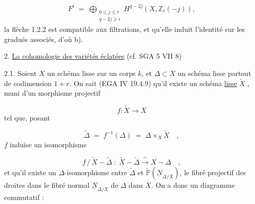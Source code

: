 \begin{multline*}
F^i \;=\; \bigoplus_{\substack{0 \leq j \leq r \\ q-2j \geq i}} H^{q-2j}(X,\mathbb{Z}_{\ell}(-j)),
\end{multline*}
la flèche 1.2.2 est compatible aux filtrations, et qu'elle induit l'identité sur les gradués associés, d'où b).


2. \underline{La cohomologie des variétés éclatées} (cf. SGA 5 VII  8)

2.1. Soient $X$ un schéma lisse sur un corps $k$, et $\Delta \subset X$ un schéma lisse partout de codimension $1 + r$. On sait (EGA IV 19.4.9) qu'il existe un schéma \underline{lisse} $\widetilde{X}$ , muni d'un morphisme projectif

\begin{equation}\tag{2.1.1}
f : \widetilde{X} \longrightarrow X
\end{equation}
tel que, posant

\begin{equation}\tag{2.1.2}
\widetilde{\Delta} \;=\; f^{-1}(\Delta) \;=\; \Delta \times_X \widetilde{X} \quad ,
\end{equation}
$f$ induise un isomorphisme

\begin{equation}\tag{2.1.3}
f \,/\, \widetilde{X} - \widetilde{\Delta} \;:\; \widetilde{X} - \widetilde{\Delta} \xrightarrow{\ \sim\ } X - \Delta \quad ,
\end{equation}
et qu'il existe un $\Delta$-isomorphisme entre $\widetilde{\Delta}$ et $\check{\mathbb{P}}(\underline{N}_{\Delta/X})$, le fibré projectif
des droites dans le fibré normal $\underline{N}_{\Delta/X}$ de $\Delta$ dans $X$. On a donc un diagramme commutatif :

